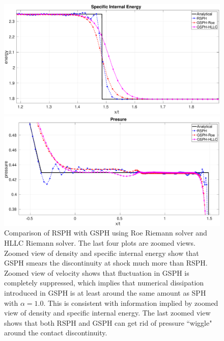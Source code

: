 \documentclass[review]{elsarticle}
\begin{document}
\begin{figure}[htp]
\begin{minipage}{.495 \textwidth}
    \end{minipage}%
       \\
    \begin{minipage}{.495 \textwidth}
        \centering
        \includegraphics[width=0.99 \textwidth,height=0.6\textwidth]{./Figures/Sod/RCM-Sod-GSPH-compare-e-zoom}
    \end{minipage}%
    \begin{minipage}{.495\textwidth}
        \centering
        \includegraphics[width=0.99 \textwidth,height=0.6\textwidth]{./Figures/Sod/RCM-Sod-GSPH-compare-p-zoom}
    \end{minipage}%
    \caption{Comparison of RSPH with GSPH using Roe Riemann solver and HLLC Riemann solver. The last four plots are zoomed views. Zoomed view of density and specific internal energy show that GSPH smears the discontinuity at shock much more than RSPH. Zoomed view of velocity shows that fluctuation in GSPH is completely suppressed, which implies that numerical dissipation introduced in GSPH is at least around the same amount as SPH with $\alpha=1.0$. This is consistent with information implied by zoomed view of density and specific internal energy. The last zoomed view shows that both RSPH and GSPH can get rid of pressure ``wiggle" around the contact discontinuity.}
    \label{fig:RCM-Sod-GSPH}
\end{figure}
\end{document}
